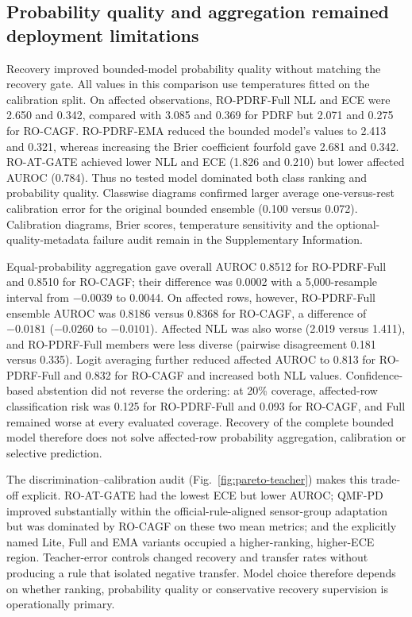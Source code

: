 \documentclass[11pt]{article}
\begin{document}
\subsection{Probability quality and aggregation remained deployment limitations}

Recovery improved bounded-model probability quality without matching the recovery gate. All values in this comparison use temperatures fitted on the calibration split. On affected observations, RO-PDRF-Full NLL and ECE were 2.650 and 0.342, compared with 3.085 and 0.369 for PDRF but 2.071 and 0.275 for RO-CAGF. RO-PDRF-EMA reduced the bounded model's values to 2.413 and 0.321, whereas increasing the Brier coefficient fourfold gave 2.681 and 0.342. RO-AT-GATE achieved lower NLL and ECE (1.826 and 0.210) but lower affected AUROC (0.784). Thus no tested model dominated both class ranking and probability quality. Classwise diagrams confirmed larger average one-versus-rest calibration error for the original bounded ensemble (0.100 versus 0.072). Calibration diagrams, Brier scores, temperature sensitivity and the optional-quality-metadata failure audit remain in the Supplementary Information.

Equal-probability aggregation gave overall AUROC 0.8512 for RO-PDRF-Full and 0.8510 for RO-CAGF; their difference was 0.0002 with a 5,000-resample interval from $-0.0039$ to 0.0044. On affected rows, however, RO-PDRF-Full ensemble AUROC was 0.8186 versus 0.8368 for RO-CAGF, a difference of $-0.0181$ ($-0.0260$ to $-0.0101$). Affected NLL was also worse (2.019 versus 1.411), and RO-PDRF-Full members were less diverse (pairwise disagreement 0.181 versus 0.335). Logit averaging further reduced affected AUROC to 0.813 for RO-PDRF-Full and 0.832 for RO-CAGF and increased both NLL values. Confidence-based abstention did not reverse the ordering: at 20\% coverage, affected-row classification risk was 0.125 for RO-PDRF-Full and 0.093 for RO-CAGF, and Full remained worse at every evaluated coverage. Recovery of the complete bounded model therefore does not solve affected-row probability aggregation, calibration or selective prediction.

The discrimination--calibration audit (Fig.~\ref{fig:pareto-teacher}) makes this trade-off explicit. RO-AT-GATE had the lowest ECE but lower AUROC; QMF-PD improved substantially within the official-rule-aligned sensor-group adaptation but was dominated by RO-CAGF on these two mean metrics; and the explicitly named Lite, Full and EMA variants occupied a higher-ranking, higher-ECE region. Teacher-error controls changed recovery and transfer rates without producing a rule that isolated negative transfer. Model choice therefore depends on whether ranking, probability quality or conservative recovery supervision is operationally primary.
\end{document}
